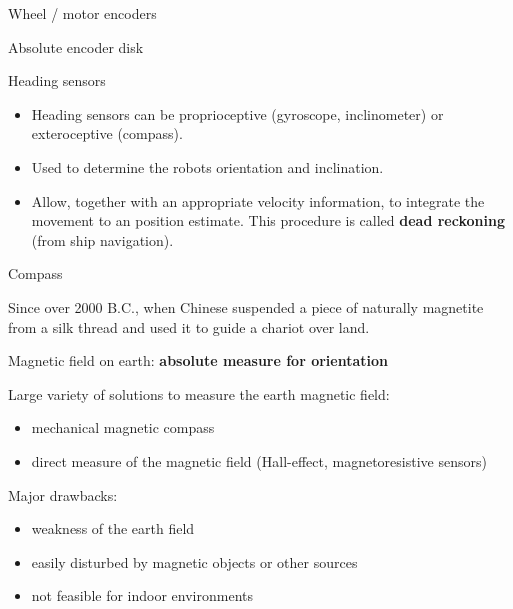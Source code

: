 \documentclass[compress]{beamer}
\begin{document}
\begin{frame}{Wheel / motor encoders}
\begin{multicols}{2}
        Absolute encoder disk

    \end{multicols}

\end{frame}

\begin{frame}{Heading sensors}

    \begin{itemize}
        \item Heading sensors can be proprioceptive (gyroscope, inclinometer) or
            exteroceptive (compass).

        \item Used to determine the robots orientation and inclination.

        \item Allow, together with an appropriate velocity information, to integrate the
            movement to an position estimate. This procedure is called
            {\bf dead reckoning} (from ship navigation).

    \end{itemize}
\end{frame}

\begin{frame}{Compass}

    Since over 2000 B.C., when Chinese suspended a piece of naturally magnetite from a silk
    thread and used it to guide a chariot over land.

    Magnetic field on earth: {\bf absolute measure for orientation}

    Large variety of solutions to measure the earth magnetic field:
    \begin{itemize}
        \item mechanical magnetic compass
        \item direct measure of the magnetic field (Hall-effect, magnetoresistive
            sensors)
    \end{itemize}

    Major drawbacks:

    \begin{itemize}
        \item weakness of the earth field
        \item easily disturbed by magnetic objects or other sources
        \item not feasible for indoor environments
    \end{itemize}

\end{frame}
\end{document}
